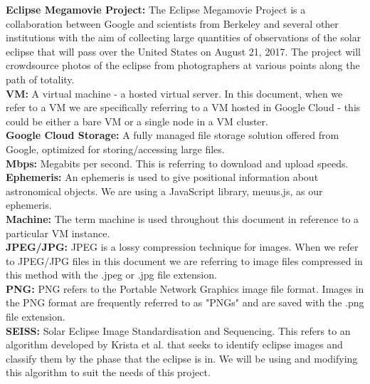 \documentclass[10pt, onecolumn, draftclsnofoot, letterpaper, compsoc]{IEEEtran}
\begin{document}
\textbf{Eclipse Megamovie Project:}
The Eclipse Megamovie Project is a collaboration between Google
and scientists from Berkeley and several other institutions with the
aim of collecting large quantities of observations of the solar eclipse
that will pass over the United States on August 21, 2017. The project
will crowdsource photos of the eclipse from photographers at various
points along the path of totality. \\

\noindent \textbf{VM:}  A virtual machine - a hosted virtual server. In this
document, when we refer to a VM we are specifically referring to a VM hosted in
Google Cloud - this could be either a bare VM or a single node in a VM cluster.\\

\noindent \textbf{Google Cloud Storage:}  A fully managed file storage solution
offered from Google, optimized for storing/accessing large files.\\

\noindent \textbf{Mbps:} Megabits per second. This is referring to download and
upload speeds.\\

\noindent \textbf{Ephemeris:} An ephemeris is used to give positional information
about astronomical objects. We are using a JavaScript library, meuus.js, as our
ephemeris.\\

\noindent \textbf{Machine:} The term machine is used throughout this document in
reference to a particular VM instance.\\

\noindent \textbf{JPEG/JPG:}
JPEG is a lossy compression technique for images. When we refer
to JPEG/JPG files in this document we are referring to image files
compressed in this method with the .jpeg or .jpg file extension. \\

\noindent \textbf{PNG:}
PNG refers to the Portable Network Graphics image file format.
Images in the PNG format are frequently referred to as "PNGs" and are
saved with the .png file extension. \\

\noindent \textbf{SEISS:} Solar Eclipse Image Standardisation and Sequencing.
This refers to an algorithm developed by Krista et al. \cite{imgKrista} that
seeks to identify eclipse images and classify them by the phase that the
eclipse is in. We will be using and modifying this algorithm to suit the needs
of this project. \\



\end{document}
